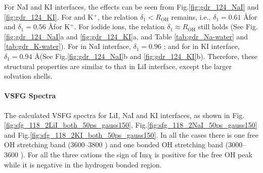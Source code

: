 For NaI and KI interfaces, the effects can be seen from Fig.\thinspace\ref{fig:gdr_124_NaI} and \ref{fig:gdr_124_KI}. For \Na and K$^+$, 
the relation $\delta_1 < R_{\text{OH}}$ remains,
i.e., $\delta_1 = 0.61$ \AA for \Na and $\delta_1 = 0.56$ \AA  for K$^+$.
For iodide ions, the relation $\delta_1 \approx R_{\text{OH}}$ still holds (See Fig.\thinspace\ref{fig:gdr_124_NaI}a and \ref{fig:gdr_124_KI}a,
and Table \ref{tab:gdr_Na-water} and \ref{tab:gdr_K-water}). For \I in NaI interface, $\delta_1 = 0.96$ \A; 
and for \I in KI interface, $\delta_1 = 0.94$ \AA (See Fig.\thinspace\ref{fig:gdr_124_NaI}b and \ref{fig:gdr_124_KI}b).
Therefore, these structural properties are similar to that in LiI interface, except the larger solvation shells.

\paragraph{VSFG Spectra}
The calculated VSFG spectra for LiI, NaI and KI interfaces, as shown in Fig.\thinspace\ref{fig:sfg_118_2LiI_both_50ps_gauss150}, Fig.\thinspace\ref{fig:sfg_118_2NaI_50ps_gauss150} and 
Fig.\thinspace\ref{fig:sfg_118_2KI_both_50ps_gauss150}. In all the cases there is one free OH stretching band (3600--3800 \centimeter) and 
one bonded OH stretching band (3000--3600 \centimeter).
For all the three cations the sign of Im$\chi$ is positive for the free OH peak while it is negative in the hydrogen bonded region. %
